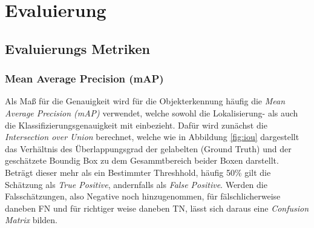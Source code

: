 \chapter{Evaluierung}\label{kap:eval}

\section{Evaluierungs Metriken}\label{sec:metricen}

\subsection*{Mean Average Precision (mAP)}
Als Maß für die Genauigkeit wird für die Objekterkennung häufig 
die \textit{Mean Average Precision (mAP)} verwendet, welche sowohl
die Lokalisierung- als auch die Klassifizierungsgenauigkeit 
mit einbezieht. Dafür wird zunächst die \textit{Intersection over 
Union} berechnet, welche wie in Abbildung \ref{fig:iou} dargestellt das Verhältnis
des Überlappungsgrad der gelabelten (Ground Truth) und der
geschätzete Boundig Box zu dem Gesammtbereich beider Boxen darstellt.
\\
Beträgt dieser mehr als ein Bestimmter Threshhold, häufig 50\%
gilt die Schätzung als \textit{True Positive}, andernfalls als 
\textit{False Positive}. Werden die Falsschätzungen, also Negative 
noch hinzugenommen, für fälschlicherweise daneben FN und für richtiger 
weise daneben TN, lässt sich daraus eine \textit{Confusion Matrix}
bilden.

\newcommand\MyBox[2]{
  \fbox{\lower0.75cm
    \vbox to 1.7cm{\vfil
      \hbox to 1.7cm{\hfil\parbox{1.4cm}{#1\\#2}\hfil}
      \vfil}%
  }%
}
\noindent
\renewcommand\arraystretch{1.5}
\setlength\tabcolsep{0pt}

